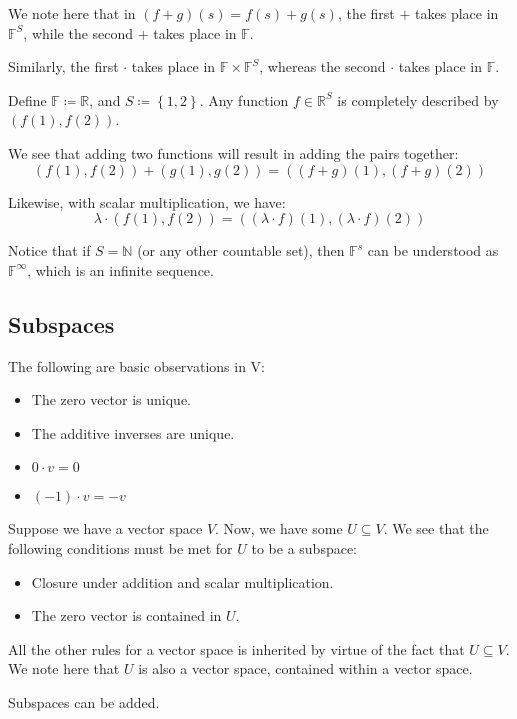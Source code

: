 \documentclass[openany]{book}
\newcommand{\NN}{\mathbb{N}}
\newcommand{\RR}{\mathbb{R}}
\begin{document}
	\begin{rmk}
		We note here that in $(f+g)(s) = f(s) + g(s)$, the first $+$ takes place in $\mathbb{F}^{S}$, while the second $+$ takes place in $\mathbb{F}$.
		
		Similarly, the first $\cdot$ takes place in $\mathbb{F} \times \mathbb{F}^{S}$, whereas the second $\cdot$ takes place in $\mathbb{F}$.
	\end{rmk}
	
	\begin{example}
		Define $\mathbb{F} \coloneq \RR$, and $S \coloneq \left\{  1,2 \right\}$. Any function $f \in \RR^{S}$ is completely described by $(f(1), f(2))$.
		
		We see that adding two functions will result in adding the pairs together:
		\begin{equation*}
			(f(1), f(2)) + (g(1), g(2)) = ( (f+g)(1), (f+g)(2))
		\end{equation*}
		
		Likewise, with scalar multiplication, we have:
		\begin{equation*}
			\lambda \cdot (f(1), f(2)) = ( (\lambda \cdot f)(1), (\lambda \cdot f)(2))
		\end{equation*}
	\end{example}
	\begin{rmk}
		Notice that if $S = \NN$ (or any other countable set), then $\mathbb{F}^{s}$ can be understood as $\mathbb{F}^{\infty}$, which is an infinite sequence.
	\end{rmk}
	
	\subsection{Subspaces}
	The following are basic observations in V:
	\begin{itemize}
		\item The zero vector is unique.
		\item The additive inverses are unique.
		\item $0 \cdot v = 0$
		\item $(-1) \cdot v = -v$
	\end{itemize}
	
	\begin{defn}[Subspaces]
		Suppose we have a vector space $V$. Now, we have some $U \subseteq V$. We see that the following conditions must be met for $U$ to be a subspace:
		\begin{itemize}
			\item Closure under addition and scalar multiplication.
			\item The zero vector is contained in $U$.
		\end{itemize}
		
		All the other rules for a vector space is inherited by virtue of the fact that $U \subseteq V$. We note here that $U$ is also a vector space, contained within a vector space.
		
		Subspaces can be added.
	\end{defn}
	
\end{document}
